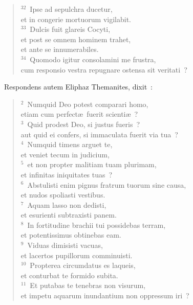 \begin{flushleft}
\begin{verse}
${}^{32}$~Ipse ad sepulchra ducetur,\\ et in congerie mortuorum vigilabit.\\
${}^{33}$~Dulcis fuit glareis Cocyti,\\ et post se omnem hominem trahet,\\ et ante se innumerabiles.\\
${}^{34}$~Quomodo igitur consolamini me frustra,\\ cum responsio vestra repugnare ostensa sit veritati~?\end{verse}\end{flushleft}


~\lettrine[lines=10,image=true,loversize=0.05,lraise=-0.03]{R}{}espondens autem Eliphaz Themanites, dixit~:
\begin{flushleft}\begin{verse}\vspace{6pt}${}^{2}$~Numquid Deo potest comparari homo,\\ etiam cum perfect\ae\ fuerit scienti\ae~?\\
${}^{3}$~Quid prodest Deo, si justus fueris~?\\ aut quid ei confers, si immaculata fuerit via tua~?\\
${}^{4}$~Numquid timens arguet te,\\ et veniet tecum in judicium,\\
${}^{5}$~et non propter malitiam tuam plurimam,\\ et infinitas iniquitates tuas~?\\
${}^{6}$~Abstulisti enim pignus fratrum tuorum sine causa,\\ et nudos spoliasti vestibus.\\
${}^{7}$~Aquam lasso non dedisti,\\ et esurienti subtraxisti panem.\\
${}^{8}$~In fortitudine brachii tui possidebas terram,\\ et potentissimus obtinebas eam.\\
${}^{9}$~Viduas dimisisti vacuas,\\ et lacertos pupillorum comminuisti.\\
${}^{10}$~Propterea circumdatus es laqueis,\\ et conturbat te formido subita.\\
${}^{11}$~Et putabas te tenebras non visurum,\\ et impetu aquarum inundantium non oppressum iri~?\\

\end{verse}
\end{flushleft}
